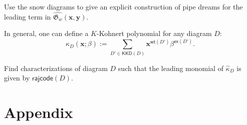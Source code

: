 \documentclass[10pt]{amsart}
\theoremstyle{plain}
\theoremstyle{plain}
\theoremstyle{definition}
\theoremstyle{definition}
\theoremstyle{definition}
\theoremstyle{plain}
\theoremstyle{plain}
\theoremstyle{plain}
\theoremstyle{plain}
\theoremstyle{plain}
\theoremstyle{remark}
\theoremstyle{remark}
\theoremstyle{plain}
\theoremstyle{plain}
\newcommand{\fG}{\mathfrak{G}}
\newcommand{\KKD}{\mathsf{KKD}}
\newcommand{\wt}{\mathsf{wt}}
\newcommand{\ex}{\mathsf{ex}}
\newcommand{\rajcode}{\mathsf{rajcode}}
\begin{document}
\begin{prob}
Use the snow diagrams to give an explicit construction of pipe dreams for the leading term
in $\widehat{\fG_w}(\bm{x},\bm{y})$.
\end{prob}

In general, one can define a $K$-Kohnert polynomial for any diagram $D$:
\[
\kappa_D(\bm{x};\beta) := \sum_{D'\in \KKD(D)}\bm{x}^{\wt(D')} \beta^{\ex(D')}.
\]

\begin{prob}
Find characterizations of diagram $D$ such that the leading monomial of $\widehat{\kappa}_D$ is given by $\rajcode(D)$.
\end{prob}

\section{Appendix}
\label{appendix}
\end{document}
